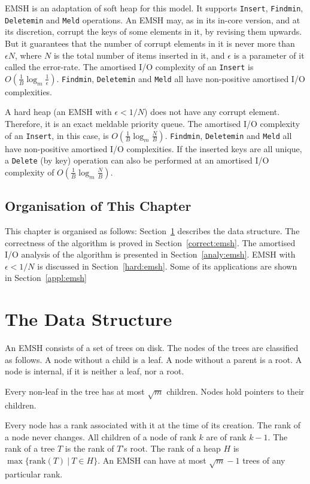 EMSH is an adaptation of soft heap for this model.
It supports {\tt Insert}, {\tt Findmin}, {\tt Deletemin} and {\tt Meld} operations.
An EMSH may, as in its in-core version, and at its discretion, 
corrupt the keys of some elements in it, by revising them upwards.
But it guarantees that the number of corrupt elements in it is never more than
$\epsilon N$, where $N$ is the total number of items inserted in it, and $\epsilon$ is
a parameter of it called the error-rate.
The amortised I/O complexity of an {\tt Insert} is $O(\frac{1}{B} \log_{m}\frac{1}{\epsilon})$.
{\tt Findmin}, {\tt Deletemin} and {\tt Meld} all have non-positive amortised I/O complexities.

A hard heap (an EMSH with $\epsilon < 1/N$) does not have any corrupt element.
Therefore, it is an exact meldable priority queue.
The amortised I/O complexity of an {\tt Insert}, in this case, is $O(\frac{1}{B} \log_{m}\frac{N}{B})$.
{\tt Findmin}, {\tt Deletemin} and {\tt Meld} all have non-positive amortised I/O complexities.
If the inserted keys are all unique, a {\tt Delete} (by key) operation can
	also be performed at an amortised I/O complexity of $O(\frac{1}{B} \log_{m}\frac{N}{B})$.



\subsection{Organisation of This Chapter}

This chapter is organised as follows: Section~\ref{datastr:emsh} describes the data structure.
The correctness of the algorithm is proved in Section~\ref{correct:emsh}.
The amortised I/O analysis of the algorithm is presented in Section~\ref{analy:emsh}.
EMSH with $\epsilon<1/N$ is discussed in Section~\ref{hard:emsh}.
Some of its applications are shown in Section~\ref{appl:emsh}
\section{The Data Structure}
\label{datastr:emsh}
An EMSH consists of a set of trees on disk.
The nodes of the trees are classified as follows.  
A node without a child is a leaf. 
A node without a parent is a root.
A node is internal, if it is neither a leaf, nor a root. 

Every non-leaf in the tree has at most $\sqrt{m}$ children.
Nodes hold pointers to their children. 

Every node has a rank associated with it at the time of its creation. 
The rank of a node never changes.
All children of a node of rank $k$ are of rank $k-1$. 
The rank of a tree $T$ is the rank of $T$'s root. 
The rank of a heap $H$ is $\max\{\mbox{rank}(T) \ |\ T\in H\}$. 
An EMSH can have at most $\sqrt{m}-1$ trees of any particular rank.

